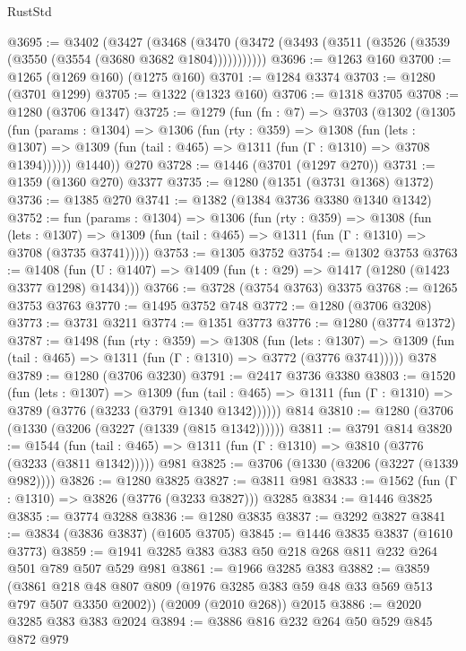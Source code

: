 \begin{lexlean}{RustStd}
\begin{coremodule}
@3695 := @3402
    (@3427
      (@3468 (@3470 (@3472 (@3493 (@3511 (@3526 (@3539 (@3550 (@3554 (@3680 @3682 @1804)))))))))))
@3696 := @1263 @160
@3700 := @1265 (@1269 @160) (@1275 @160)
@3701 := @1284 @3374
@3703 := @1280 (@3701 @1299)
@3705 := @1322 (@1323 @160)
@3706 := @1318 @3705
@3708 := @1280 (@3706 @1347)
@3725 := @1279
    (fun (fn : @7) =>
    @3703
      (@1302
        (@1305
          (fun (params : @1304) =>
          @1306
            (fun (rty : @359) =>
            @1308
              (fun (lets : @1307) =>
              @1309 (fun (tail : @465) => @1311 (fun (Γ : @1310) => @3708 @1394))))))
        @1440))
    @270
@3728 := @1446 (@3701 (@1297 @270))
@3731 := @1359 (@1360 @270) @3377
@3735 := @1280 (@1351 (@3731 @1368) @1372)
@3736 := @1385 @270
@3741 := @1382 (@1384 @3736 @3380 @1340 @1342)
@3752 := fun (params : @1304) =>
  @1306
    (fun (rty : @359) =>
    @1308
      (fun (lets : @1307) =>
      @1309 (fun (tail : @465) => @1311 (fun (Γ : @1310) => @3708 (@3735 @3741)))))
@3753 := @1305 @3752
@3754 := @1302 @3753
@3763 := @1408 (fun (U : @1407) => @1409 (fun (t : @29) => @1417 (@1280 (@1423 @3377 @1298) @1434)))
@3766 := @3728 (@3754 @3763) @3375
@3768 := @1265 @3753 @3763
@3770 := @1495 @3752 @748
@3772 := @1280 (@3706 @3208)
@3773 := @3731 @3211
@3774 := @1351 @3773
@3776 := @1280 (@3774 @1372)
@3787 := @1498
    (fun (rty : @359) =>
    @1308
      (fun (lets : @1307) =>
      @1309 (fun (tail : @465) => @1311 (fun (Γ : @1310) => @3772 (@3776 @3741)))))
    @378
@3789 := @1280 (@3706 @3230)
@3791 := @2417 @3736 @3380
@3803 := @1520
    (fun (lets : @1307) =>
    @1309
      (fun (tail : @465) => @1311 (fun (Γ : @1310) => @3789 (@3776 (@3233 (@3791 @1340 @1342))))))
    @814
@3810 := @1280 (@3706 (@1330 (@3206 (@3227 (@1339 (@815 @1342))))))
@3811 := @3791 @814
@3820 := @1544
    (fun (tail : @465) => @1311 (fun (Γ : @1310) => @3810 (@3776 (@3233 (@3811 @1342)))))
    @981
@3825 := @3706 (@1330 (@3206 (@3227 (@1339 @982))))
@3826 := @1280 @3825
@3827 := @3811 @981
@3833 := @1562 (fun (Γ : @1310) => @3826 (@3776 (@3233 @3827))) @3285
@3834 := @1446 @3825
@3835 := @3774 @3288
@3836 := @1280 @3835
@3837 := @3292 @3827
@3841 := @3834 (@3836 @3837) (@1605 @3705)
@3845 := @1446 @3835 @3837 (@1610 @3773)
@3859 := @1941 @3285 @383 @383 @50 @218 @268 @811 @232 @264 @501 @789 @507 @529 @981
@3861 := @1966 @3285 @383
@3882 := @3859
    (@3861 @218 @48 @807 @809 (@1976 @3285 @383 @59 @48 @33 @569 @513 @797 @507 @3350 @2002))
    (@2009 (@2010 @268))
    @2015
@3886 := @2020 @3285 @383 @383 @2024
@3894 := @3886 @816 @232 @264 @50 @529 @845 @872 @979

\end{coremodule}
\end{lexlean}
